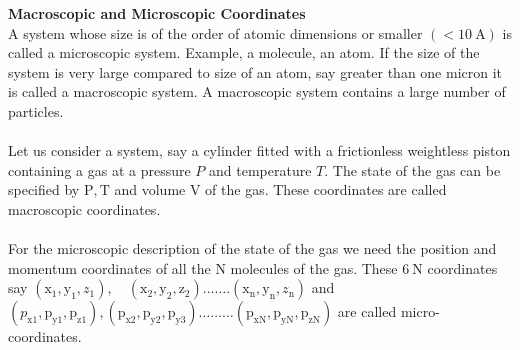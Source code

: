 \textbf{Macroscopic and Microscopic Coordinates}\\
A system whose size is of the order of atomic dimensions or smaller $(<10 \mathrm{~A})$ is called a microscopic system. Example, a molecule, an atom. If the size of the system is very large compared to size of an atom, say greater than one micron it is called a macroscopic system. A macroscopic system contains a large number of particles.\\\\
Let us consider a system, say a cylinder fitted with a frictionless weightless piston containing a gas at a pressure $P$ and temperature $T$. The state of the gas can be specified by $\mathrm{P}, \mathrm{T}$ and volume $\mathrm{V}$ of the gas. These coordinates are called macroscopic coordinates.\\\\
For the microscopic description of the state of the gas we need the position and momentum coordinates of all the $\mathrm{N}$ molecules of the gas. These $6 \mathrm{~N}$ coordinates say $\left(\mathrm{x}_{1}, \mathrm{y}_{1}, z_{1}\right), \quad\left(\mathrm{x}_{2}, \mathrm{y}_{2}, \mathrm{z}_{2}\right) \ldots \ldots .\left(\mathrm{x}_{\mathrm{n}}, \mathrm{y}_{\mathrm{n}}, z_{\mathrm{n}}\right)$ and $\left(p_{\mathrm{x} 1}, \mathrm{p}_{\mathrm{y} 1}, \mathrm{p}_{\mathrm{z} 1}\right),\left(\mathrm{p}_{\mathrm{x} 2}, \mathrm{p}_{\mathrm{y} 2}, \mathrm{p}_{\mathrm{y} 3}\right) \ldots \ldots \ldots\left(\mathrm{p}_{\mathrm{xN}}, \mathrm{p}_{\mathrm{yN}}, \mathrm{p}_{\mathrm{zN}}\right)$ are called micro- coordinates.\\
